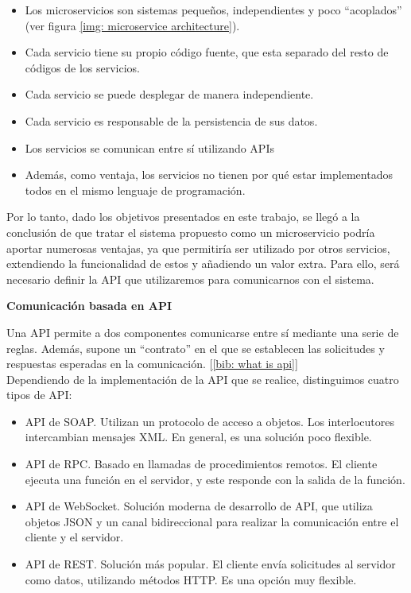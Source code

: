 \documentclass[a4paper, oneside, 12pt]{book}
\begin{document}
	\begin{itemize}
		\item Los microservicios son sistemas pequeños, independientes y poco ``acoplados'' (ver figura \ref{img: microservice architecture}).
		
		\item Cada servicio tiene su propio código fuente, que esta separado del resto de códigos de los servicios.
		
		\item Cada servicio se puede desplegar de manera independiente. 
		
		\item Cada servicio es responsable de la persistencia de sus datos.
		
		\item Los servicios se comunican entre sí utilizando APIs
		
		\item Además, como ventaja, los servicios no tienen por qué estar implementados todos en el mismo lenguaje de programación.
	\end{itemize}

	\noindent Por lo tanto, dado los objetivos presentados en este trabajo, se llegó a la conclusión de que tratar el sistema propuesto como un microservicio podría aportar numerosas ventajas, ya que permitiría ser utilizado por otros servicios, extendiendo la funcionalidad de estos y añadiendo un valor extra. Para ello, será necesario definir la API que utilizaremos para comunicarnos con el sistema.
	
	\pagebreak
	
	\noindent \textbf{\large Comunicación basada en \textbf{API}} \\
	\label{sec: api}
	
	\noindent Una API permite a dos componentes comunicarse entre sí mediante una serie de reglas. Además, supone un ``contrato'' en el que se establecen las solicitudes y respuestas esperadas en la comunicación. [\ref{bib: what is api}] \\
	
	\noindent Dependiendo de la implementación de la API que se realice, distinguimos cuatro tipos de API:
	
	\begin{itemize}
		\item API de SOAP. Utilizan un protocolo de acceso a objetos. Los interlocutores intercambian mensajes XML. En general, es una solución poco flexible.
		
		\item API de RPC. Basado en llamadas de procedimientos remotos. El cliente ejecuta una función en el servidor, y este responde con la salida de la función.
		
		\item API de WebSocket. Solución moderna de desarrollo de API, que utiliza objetos JSON y un canal bidireccional para realizar la comunicación entre el cliente y el servidor.
		
		\item API de REST. Solución más popular. El cliente envía solicitudes al servidor como datos, utilizando métodos HTTP. Es una opción muy flexible.
	\end{itemize}
	
\end{document}
